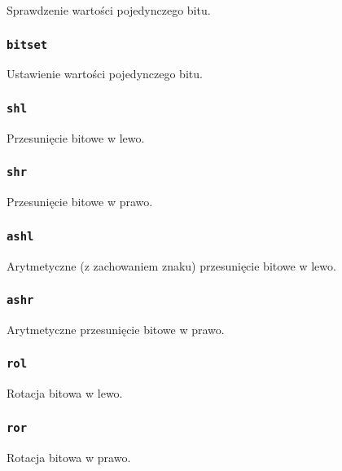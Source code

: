 Sprawdzenie wartości pojedynczego bitu.

\subsubsection{\texttt{bitset}}

Ustawienie wartości pojedynczego bitu.

\subsubsection{\texttt{shl}}

Przesunięcie bitowe w lewo.

\subsubsection{\texttt{shr}}

Przesunięcie bitowe w prawo.

\subsubsection{\texttt{ashl}}

Arytmetyczne (z zachowaniem znaku) przesunięcie bitowe w lewo.

\subsubsection{\texttt{ashr}}

Arytmetyczne przesunięcie bitowe w prawo.

\subsubsection{\texttt{rol}}

Rotacja bitowa w lewo.

\subsubsection{\texttt{ror}}

Rotacja bitowa w prawo.
